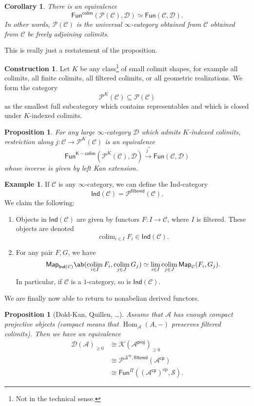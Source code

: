 \documentclass[10pt]{amsart}
\newtheorem{cor}[thm]{Corollary}
\newtheorem{prop}[thm]{Proposition}
\theoremstyle{definition}
\newtheorem{con}[thm]{Construction}
\newtheorem{exm}[thm]{Example}
\theoremstyle{remark}
\theoremstyle{plain}
\theoremstyle{definition}
\theoremstyle{remark}
\newcommand{\mc}[1]{\mathcal{#1}}
\newcommand{\ms}[1]{\mathsf{#1}}
\newcommand{\1}{\mathbf{1}}
\newcommand{\2}{\mathbf{2}}
\newcommand{\3}{\mathbf{3}}
\DeclareMathOperator{\Hom}{Hom}
\DeclareMathOperator{\op}{op}
\DeclareMathOperator*{\colim}{colim}
\begin{document}
\begin{cor}
    There is an equivalence
    \[ \ms{Fun}^{\ms{colim}}(\mc{P}(\mc{C}), \mc{D}) \simeq \ms{Fun}(\mc{C}, \mc{D}). \]
    In other words, $\mc{P}(\mc{C})$ is the universal $\infty$-category obtained from $\mc{C}$ obtained from $\mc{C}$ be freely adjoining colimits.
\end{cor}
This is really just a restatement of the proposition.

\begin{con}
    Let $K$ be any class\footnote{Not in the technical sense.} of small colimit shapes, for example all colimits, all finite colimits, all filtered colimits, or all geometric realizations. We form the category
    \[ \mc{P}^K(\mc{C}) \subseteq \mc{P}(\mc{C}) \]
    as the smallest full subcategory which contains representables and which is closed under $K$-indexed colimits.
\end{con}

\begin{prop}
    For any large $\infty$-category $\mc{D}$ which admits $K$-indexed colimits, restriction along $j \colon \mc{C} \to \mc{P}^K(\mc{C})$ is an equivalence
    \[ \ms{Fun}^{\ms{K-colim}} (\mc{P}^K(\mc{C}), \mc{D}) \xrightarrow{j^*} \ms{Fun}(\mc{C}, \mc{D}) \]
    whose inverse is given by left Kan extension.
\end{prop}

\begin{exm}
    If $\mc{C}$ is any $\infty$-category, we can define the Ind-category
    \[ \ms{Ind}(\mc{C}) = \mc{P}^{\ms{filtered}}(\mc{C}). \]
    We claim the following:
    \begin{enumerate}
        \item Objects in $\ms{Ind}(\mc{C})$ are given by functors $F \colon I \to \mc{C}$, where $I$ is filtered. These objects are denoted
        \[ \colim_{i \in I} F_i \in \ms{Ind}(\mc{C}). \]
        \item For any pair $F, G$, we have
        \[ \ms{Map}_{\ms{Ind}(\mc{C})} \ab(\colim_{i \in I} F_i, \colim_{j \in J} G_j) \simeq \lim_{i \in I} \colim_{j \in J} \ms{Map}_{\mc{C}}(F_i, G_j). \]
        In particular, if $\mc{C}$ is a $1$-category, so is $\ms{Ind}(\mc{C})$.
    \end{enumerate}
\end{exm}

We are finally now able to return to nonabelian derived functors.
\begin{prop}[Dold-Kan, Quillen, \dots]
    Assume that $\mc{A}$ has enough compact projective objects (compact means that $\Hom_{\mc{A}}(A,-)$ preserves filtered colimits). Then we have an equivalence
    \begin{align*}
        \mc{D}(\mc{A})_{\geq 0} &\cong \mc{K}(\mc{A}^{\ms{proj}})_{\geq 0} \\
        &\cong \mc{P}^{\Delta^{\op}, \ms{filtered}}(\mc{A}^{\ms{cp}}) \\
        &\cong \ms{Fun}^{\Pi} ((\mc{A}^{\ms{cp}})^{\op}, \mc{S}).
    \end{align*}
\end{prop}
\end{document}
